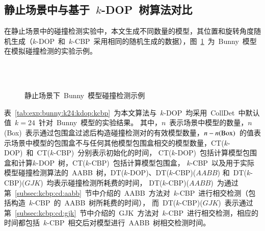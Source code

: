 \subsection{静止场景中与基于~$k$-DOP~树算法对比}
\label{subsec:exper:kdop:kcbp:static}
在静止场景中的碰撞检测实验中，本文生成不同数量的模型，其位置和旋转角度随机生成（$k$-DOP~和~$k$-CBP~采用相同的随机生成的数据），图~\ref{fig:static:cd:bunny}~为~Bunny~模型在模拟碰撞检测的实验示例。

\begin{figure}[htbp]
\centering
{} 
\\ 
\\
\caption{静止场景下~Bunny~模型碰撞检测示例}
\label{fig:static:cd:bunny}
\end{figure}

表~\ref{tab:exp:bunny:k24:kdop:kcbp}~为本文算法与~$k$-DOP~均采用~CollDet~中默认值~$k=24$~针对~Bunny~模型的实验结果。
其中，$n$~表示场景中模型的数量，$n$(Box)~表示通过包围盒过滤后构造碰撞检测对的有效模型数量，$n-n(\textnormal{Box})$~的值表示场景中模型的包围盒不与任何其他模型包围盒相交的模型数量，CT($k$-DOP)~和~CT($k$-CBP)~分别表示初始化的时间， CT($k$-DOP)~包括计算模型包围盒和计算$k$-DOP~树，CT($k$-CBP)~包括计算模型包围盒，
$k$-CBP~以及用于实际模型碰撞检测算法的~AABB~树，DT($k$-DOP)、DT($k$-CBP)($AABB$) 和~DT($k$-CBP)($GJK$)~均表示碰撞检测所耗费的时间， 
DT($k$-CBP)($AABB$)~为通过第~\ref{subsec:kcbp:cd:aabb}~节中介绍的~AABB~方法对~$k$-CBP~进行相交检测（包括构造~$k$-CBP~的~AABB~树所耗费的时间），
而~DT($k$-CBP)($GJK$)~表示通过第~\ref{subsec:kcbp:cd:gjk}~节中介绍的~GJK~方法对~$k$-CBP~进行相交检测，相应的时间都包括~$k$-CBP~相交后对模型进行~AABB~树相交检测时间。

